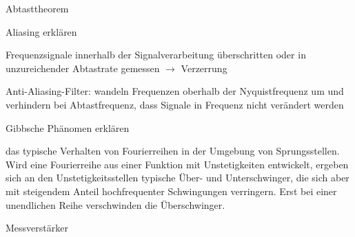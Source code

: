 \documentclass[10pt, a4paper]{exam}
\begin{document}
\begin{questions}
  \question Abtasttheorem

  \question Aliasing erklären
  \begin{solution}
    Frequenzsignale innerhalb der Signalverarbeitung überschritten oder in unzureichender Abtastrate gemessen $\rightarrow$ Verzerrung

    Anti-Aliasing-Filter: wandeln Frequenzen oberhalb der Nyquistfrequenz um und verhindern bei Abtastfrequenz, dass Signale in Frequenz nicht verändert werden
  \end{solution}

  \question Gibbsche Phänomen erklären
  \begin{solution}
    das typische Verhalten von Fourierreihen in der Umgebung von Sprungsstellen. Wird eine Fourierreihe aus einer Funktion mit Unstetigkeiten entwickelt, ergeben sich an den Unstetigkeitsstellen typische Über- und Unterschwinger, die sich aber mit steigendem Anteil hochfrequenter Schwingungen verringern. Erst bei einer unendlichen Reihe verschwinden die Überschwinger.
  \end{solution}

  \question Messverstärker
\end{questions}
\end{document}
